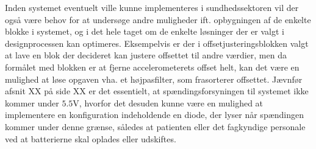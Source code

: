 \noindent Inden systemet eventuelt ville kunne implementeres i sundhedssektoren vil der også være behov for at undersøge andre muligheder ift. opbygningen af de enkelte blokke i systemet, og i det hele taget om de enkelte løsninger der er valgt i designprocessen kan optimeres. Eksempelvis er der i offsetjusteringsblokken valgt at lave en blok der decideret kan justere offsettet til andre værdier, men da formålet med blokken er at fjerne accelerometerets offset helt, kan det være en mulighed at løse opgaven vha. et højpasfilter, som frasorterer offsettet. Jævnfør afsnit XX på side XX er det essentielt, at spændingsforsyningen til systemet ikke kommer under $5.5$V, hvorfor det desuden kunne være en mulighed at implementere en konfiguration indeholdende en diode, der lyser når spændingen kommer under denne grænse, således at patienten eller det fagkyndige personale ved at batterierne skal oplades eller udskiftes. 
  
 
 